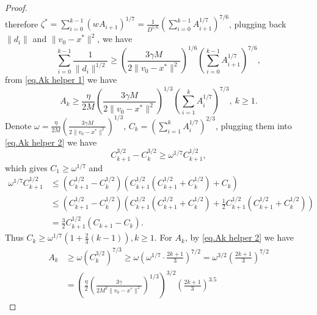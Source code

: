 \documentclass{article}
\begin{document}
\begin{proof}
\begin{equation*}
\end{equation*}
therefore $\zeta^*=\sum_{i=0}^{k-1}\left(w A_{i+1}\right)^{1 / 7}=\frac{1}{D^{1 / 6}}\left(\sum_{i=0}^{k-1} A_{i+1}^{1 / 7}\right)^{7 / 6}$, plugging back $\|d_i\| $ and $ \|v_0-x^*\|^2$, we have
\begin{equation*}
    \sum_{i=0}^{k-1}\frac{1}{\|d_i\|^{1/2}} \geq \left (\frac{3\gamma M}{2\|v_0-x^*\|^2}\right)^{1/6} \left(\sum_{i=0}^{k-1} A_{i+1}^{1 / 7}\right)^{7 / 6},
\end{equation*}
from \eqref{eq.Ak helper 1} we have
\begin{equation}
    \label{eq.Ak helper 2}
    A_k \geq \frac{\eta}{2M}\left (\frac{3\gamma M}{2\|v_0-x^*\|^2}\right)^{1/3} \left(\sum_{i=1}^{k} A_{i}^{1 / 7}\right)^{7 / 3}, \ k\geq 1.
\end{equation}
Denote $\omega = \frac{\eta}{2M}\left (\frac{3\gamma M}{2\|v_0-x^*\|^2}\right)^{1/3}$, $C_k =\left(\sum_{i=1}^k A_i^{1 / 7}\right)^{2 / 3}$, plugging them into \eqref{eq.Ak helper 2} we have
\begin{equation*}
    C_{k+1}^{3 / 2}-C_k^{3 / 2} \geq \omega^{1 / 7} C_{k+1}^{1 / 2},
\end{equation*}
which gives $C_1\geq \omega^{1/7}$ and 
\begin{equation*}
\begin{aligned}
\omega^{1 / 7} C_{k+1}^{1 / 2} & \leq\left(C_{k+1}^{1 / 2}-C_k^{1 / 2}\right)\left(C_{k+1}^{1 / 2}\left(C_{k+1}^{1 / 2}+C_k^{1 / 2}\right)+C_k\right) \\
& \leq\left(C_{k+1}^{1 / 2}-C_k^{1 / 2}\right)\left(C_{k+1}^{1 / 2}\left(C_{k+1}^{1 / 2}+C_k^{1 / 2}\right)+\frac{1}{2} C_{k+1}^{1 / 2}\left(C_{k+1}^{1 / 2}+C_k^{1 / 2}\right)\right) \\
& =\frac{3}{2} C_{k+1}^{1 / 2}\left(C_{k+1}-C_k\right).
\end{aligned}
\end{equation*}
Thus $C_k \geq \omega^{1 / 7}\left(1+\frac{2}{3}(k-1)\right), k \geq 1$. For $A_k$, by \eqref{eq.Ak helper 2} we have
\begin{equation*}
\begin{aligned}
A_k & \geq \omega\left(C_k^{3 / 2}\right)^{7 / 3} \geq \omega\left(\omega^{1 / 7} \cdot \frac{2 k+1}{3}\right)^{7 / 2}=\omega^{3 / 2}\left(\frac{2 k+1}{3}\right)^{7 / 2} \\
& =\left(\frac{\eta}{2}\left (\frac{3\gamma}{2M^2\|v_0-x^*\|^2}\right)^{1/3}\right)^{3 / 2}\left(\frac{2 k+1}{3}\right)^{3.5}
\end{aligned}
\end{equation*}
\end{proof}
\end{document}
